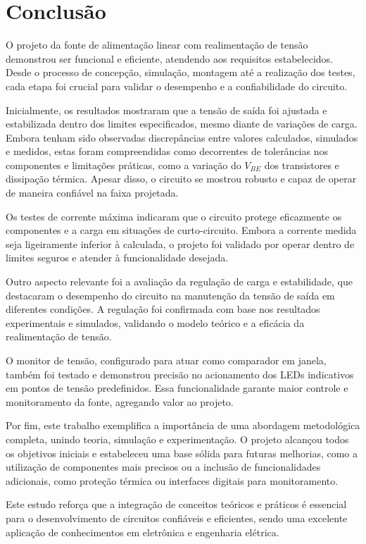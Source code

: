 \section{Conclusão}

O projeto da fonte de alimentação linear com realimentação de tensão demonstrou ser funcional e eficiente, atendendo aos requisitos estabelecidos. Desde o processo de concepção, simulação, montagem até a realização dos testes, cada etapa foi crucial para validar o desempenho e a confiabilidade do circuito.

Inicialmente, os resultados mostraram que a tensão de saída foi ajustada e estabilizada dentro dos limites especificados, mesmo diante de variações de carga. Embora tenham sido observadas discrepâncias entre valores calculados, simulados e medidos, estas foram compreendidas como decorrentes de tolerâncias nos componentes e limitações práticas, como a variação do \(V_{BE}\) dos transistores e dissipação térmica. Apesar disso, o circuito se mostrou robusto e capaz de operar de maneira confiável na faixa projetada.

Os testes de corrente máxima indicaram que o circuito protege eficazmente os componentes e a carga em situações de curto-circuito. Embora a corrente medida seja ligeiramente inferior à calculada, o projeto foi validado por operar dentro de limites seguros e atender à funcionalidade desejada.

Outro aspecto relevante foi a avaliação da regulação de carga e estabilidade, que destacaram o desempenho do circuito na manutenção da tensão de saída em diferentes condições. A regulação foi confirmada com base nos resultados experimentais e simulados, validando o modelo teórico e a eficácia da realimentação de tensão.

O monitor de tensão, configurado para atuar como comparador em janela, também foi testado e demonstrou precisão no acionamento dos LEDs indicativos em pontos de tensão predefinidos. Essa funcionalidade garante maior controle e monitoramento da fonte, agregando valor ao projeto.

Por fim, este trabalho exemplifica a importância de uma abordagem metodológica completa, unindo teoria, simulação e experimentação. O projeto alcançou todos os objetivos iniciais e estabeleceu uma base sólida para futuras melhorias, como a utilização de componentes mais precisos ou a inclusão de funcionalidades adicionais, como proteção térmica ou interfaces digitais para monitoramento.

Este estudo reforça que a integração de conceitos teóricos e práticos é essencial para o desenvolvimento de circuitos confiáveis e eficientes, sendo uma excelente aplicação de conhecimentos em eletrônica e engenharia elétrica.
